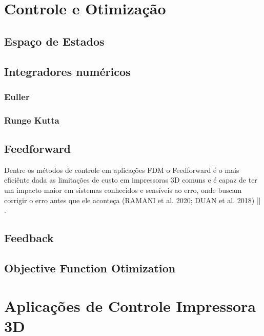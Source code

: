 \section{Controle e Otimização}

\subsection{Espaço de Estados}

\subsection{Integradores numéricos}

\subsubsection{Euller}

\subsubsection{Runge Kutta}


\subsection{Feedforward}
Dentre os métodos de controle em aplicações FDM o Feedforward 
é o mais eficiênte dada as limitações de custo em impressoras 
3D comuns e é capaz de ter um impacto maior em sistemas 
conhecidos e sensíveis ao erro, onde buscam corrigir o erro 
antes que ele aconteça (RAMANI et al. 2020; DUAN et al. 2018) || \cite{ramani20}\cite{duan18}.

\subsection{Feedback}

\subsection{Objective Function Otimization}

\section{Aplicações de Controle Impressora 3D}

